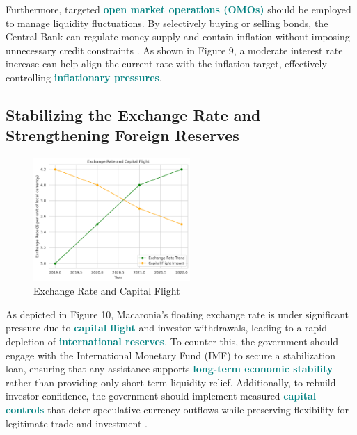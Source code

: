 Furthermore, targeted \textbf{\textcolor{teal}{open market operations (OMOs)}} should be 
employed to manage liquidity fluctuations. By selectively buying or selling bonds, the Central Bank can regulate
money supply and contain inflation without imposing unnecessary credit constraints \textcolor{orange}{\cite{claessens2017}}.
As shown in Figure 9, a moderate interest rate increase can help align the current rate with the inflation target, 
effectively controlling \textcolor{teal}{\textbf{inflationary pressures}}.

\newpage
\subsection*{Stabilizing the Exchange Rate and Strengthening Foreign Reserves}

\begin{figure}[h]     
     \centering
     \includegraphics[width=0.53\textwidth]{exchange.png}
     \caption{Exchange Rate and Capital Flight}
     \label{fig:graph_1}
\end{figure}

As depicted in Figure 10, Macaronia's floating exchange rate is under significant
pressure due to \textcolor{teal}{\textbf{capital flight}} and investor withdrawals, 
leading to a rapid depletion of \textcolor{teal}{\textbf{international reserves}}. 
To counter this, the government should engage with the International Monetary Fund (IMF)
to secure a stabilization loan, ensuring that any assistance supports 
\textcolor{teal}{\textbf{long-term economic stability}} rather than providing only short-term 
liquidity relief. Additionally, to rebuild investor confidence, the government should implement 
measured \textcolor{teal}{\textbf{capital controls}} that deter speculative currency outflows while
preserving flexibility for legitimate trade and investment \textcolor{orange}{\cite{imf2024}}.



